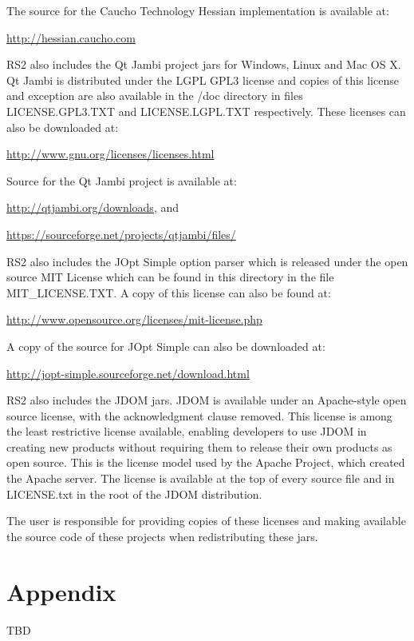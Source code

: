 \documentclass[10pt]{article}
\begin{document}
\bigbreak \noindent
The source for the Caucho Technology Hessian implementation is available at:

\noindent
\hyperref[http://hessian.caucho.com]{\color{blue}http://hessian.caucho.com}

\bigbreak \noindent
RS2 also includes the Qt Jambi project jars for Windows, Linux and Mac OS X.  Qt
Jambi is distributed under the LGPL GPL3 license and copies of this license and
exception are also available in the /doc directory in files LICENSE.GPL3.TXT and
LICENSE.LGPL.TXT respectively. These licenses can also be downloaded at:

\noindent
\hyperref[http://www.gnu.org/licenses/licenses.html]{\color{blue}http://www.gnu.org/licenses/licenses.html}

\bigbreak \noindent
Source for the Qt Jambi project is available at:

\noindent
\hyperref[http://qtjambi.org/downloads]{\color{blue}http://qtjambi.org/downloads}, and

\noindent
\hyperref[https://sourceforge.net/projects/qtjambi/files/]{\color{blue}https://sourceforge.net/projects/qtjambi/files/}

\bigbreak \noindent
RS2 also includes the JOpt Simple option parser which is released under
the open source MIT License which can be found in this directory in the file
MIT\_LICENSE.TXT.  A copy of this license can also be found at:

\noindent
\hyperref[http://www.opensource.org/licenses/mit-license.php]{\color{blue}http://www.opensource.org/licenses/mit-license.php}

\bigbreak \noindent   
A copy of the source for JOpt Simple can also be downloaded at:

\noindent
\hyperref[http://jopt-simple.sourceforge.net/download.html]{\color{blue}http://jopt-simple.sourceforge.net/download.html}

\bigbreak \noindent
RS2 also includes the JDOM jars.  JDOM is available under an Apache-style open
source license, with the acknowledgment clause removed. This license is among
the least restrictive license available, enabling developers to use JDOM in
creating new products without requiring them to release their own products as
open source. This is the license model used by the Apache Project, which created
the Apache server. The license is available at the top of every source file and
in LICENSE.txt in the root of the JDOM distribution.              

\bigbreak \noindent
The user is responsible for providing copies of these licenses and making
available the source code of these projects when redistributing these jars.

\section{Appendix}
TBD
\end{document}
